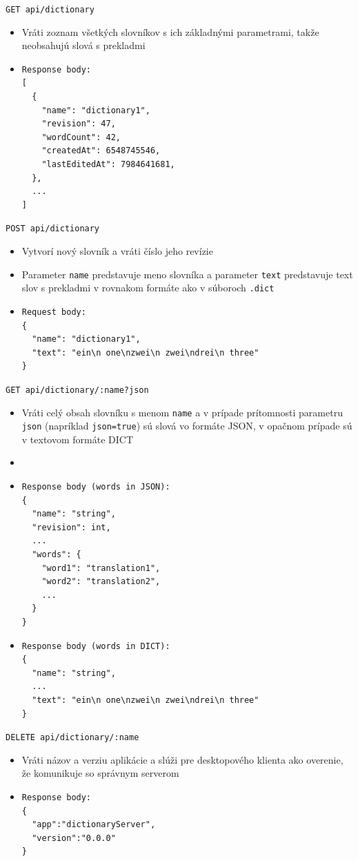 \documentclass[
  digital, %
  table,   %
  lof,     %
  lot,     %
]{fithesis3}
\begin{document}
\noindent
\texttt{GET api/dictionary}
\begin{itemize}
\item Vráti zoznam všetkých slovníkov s ich základnými parametrami, takže neobsahujú slová s prekladmi
\item \begin{lstlisting}[basicstyle=\small]
Response body:
[
  {
  	"name": "dictionary1",
  	"revision": 47,
    "wordCount": 42,
    "createdAt": 6548745546,
    "lastEditedAt": 7984641681,
  },
  ...
]
\end{lstlisting}
\end{itemize}

\noindent
\texttt{POST api/dictionary}
\begin{itemize}
\item Vytvorí nový slovník a vráti číslo jeho revízie
\item Parameter \texttt{name} predstavuje meno slovníka a parameter \texttt{text} predstavuje text slov s prekladmi v rovnakom formáte ako v súboroch \texttt{.dict}
\item \begin{lstlisting}[basicstyle=\small]
Request body:
{
  "name": "dictionary1",
  "text": "ein\n one\nzwei\n zwei\ndrei\n three"
}
\end{lstlisting}
\end{itemize}

\noindent
\texttt{GET api/dictionary/:name?json}
\begin{itemize}
\item Vráti celý obsah slovníku s menom \texttt{name} a v prípade prítomnosti parametru \texttt{json} (napríklad \texttt{json=true}) sú slová vo formáte JSON, v opačnom prípade sú v textovom formáte DICT
\item 
\item \begin{lstlisting}[basicstyle=\small]
Response body (words in JSON):
{
  "name": "string",
  "revision": int,
  ...
  "words": {
  	"word1": "translation1",
    "word2": "translation2",
    ...
  }
}
\end{lstlisting}
\item \begin{lstlisting}[basicstyle=\small]
Response body (words in DICT):
{
  "name": "string",
  ...
  "text": "ein\n one\nzwei\n zwei\ndrei\n three"
}
\end{lstlisting}
\end{itemize}

\noindent
\texttt{DELETE api/dictionary/:name}
\begin{itemize}
\item Vráti názov a verziu aplikácie a slúži pre desktopového klienta ako overenie, že komunikuje so správnym serverom
\item \begin{lstlisting}[basicstyle=\small]
Response body:
{
  "app":"dictionaryServer",
  "version":"0.0.0"
}
\end{lstlisting}
\end{itemize}
\end{document}
